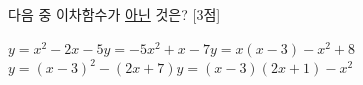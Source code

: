 다음 중 이차함수가 \underline{아닌} 것은? \mbox{[3점]}
\begin{choicesii}{$y=x^2-2x-5$}{$y=-5x^2+x-7$}{$y=x(x-3)-x^2+8$}{$y=(x-3)^2-(2x+7)$}{$y=(x-3)(2x+1)-x^2$}\end{choicesii}
